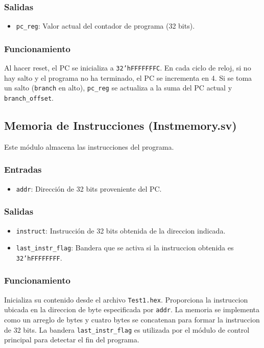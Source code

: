 \documentclass[conference]{IEEEtran}
\begin{document}
\subsubsection{Salidas}
\begin{itemize}
    \item \texttt{pc\_reg}: Valor actual del contador de programa (32 bits).
\end{itemize}
\subsubsection{Funcionamiento}
Al hacer reset, el PC se inicializa a \texttt{32'hFFFFFFFC}. En cada ciclo de reloj, si no hay salto y el programa no ha terminado, el PC se incrementa en 4. Si se toma un salto (\texttt{branch} en alto), \texttt{pc\_reg} se actualiza a la suma del PC actual y \texttt{branch\_offset}.

\subsection{Memoria de Instrucciones (Instmemory.sv)}
Este módulo almacena las instrucciones del programa.
\subsubsection{Entradas}
\begin{itemize}
    \item \texttt{addr}: Dirección de 32 bits proveniente del PC.
\end{itemize}
\subsubsection{Salidas}
\begin{itemize}
    \item \texttt{instruct}: Instrucción de 32 bits obtenida de la direccion indicada.
    \item \texttt{last\_instr\_flag}: Bandera que se activa si la instruccion obtenida es \texttt{32'hFFFFFFFF}.
\end{itemize}
\subsubsection{Funcionamiento}
Inicializa su contenido desde el archivo \texttt{Test1.hex}. Proporciona la instruccion ubicada en la direccion de byte especificada por \texttt{addr}. La memoria se implementa como un arreglo de bytes y cuatro bytes se concatenan para formar la instruccion de 32 bits. La bandera \texttt{last\_instr\_flag} es utilizada por el módulo de control principal para detectar el fin del programa.
\end{document}
